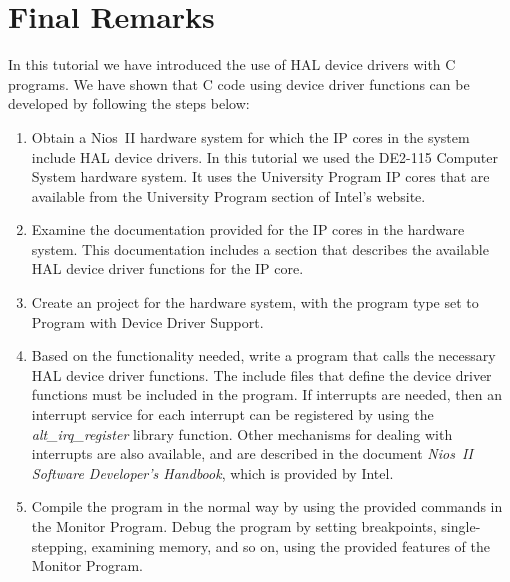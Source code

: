 \documentclass[11pt, twoside, pdftex]{article}
\newcommand{\commonPath}{../../Common}
\begin{document}
\section{Final Remarks}

In this tutorial we have introduced the use of HAL device drivers with C programs. We have
shown that C code using device driver functions can be developed by following the steps below:

\begin{enumerate}
\item Obtain a Nios~II hardware system for which the IP cores in the system include HAL
device drivers. In this tutorial we used the DE2-115 Computer System hardware system. It uses
the University Program IP cores that are available from the University Program section of
Intel's website.

\item Examine the documentation provided for the IP cores in the hardware system. This
documentation includes a section that describes the available HAL device driver functions
for the IP core.

\item Create an \productNameMed{} project for the hardware system, with the program type
set to {\sf Program with Device Driver Support}.

\item Based on the functionality needed, write a program that calls the
necessary HAL device driver functions. The include files that define the device
driver functions must be included in the program. If interrupts are needed, then an 
interrupt service for each interrupt can be registered by using the {\it
alt\_irq\_register} library function. Other mechanisms for dealing with interrupts are 
also available, and are described in the document {\it Nios~II Software Developer's
Handbook}, which is provided by Intel.

\item Compile the program in the normal way by using the provided commands in the Monitor
Program. Debug the program by setting breakpoints, single-stepping, examining memory, and
so on, using the provided features of the Monitor Program.
\end{enumerate}



\end{document}
